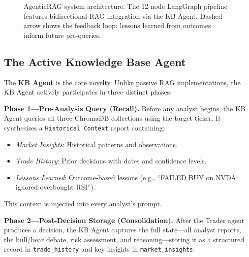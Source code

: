 \documentclass[conference]{IEEEtran}
\begin{document}
\begin{figure}[htbp]
\caption{AgenticRAG system architecture. The 12-node LangGraph pipeline features bidirectional RAG integration via the KB Agent. Dashed arrow shows the feedback loop: lessons learned from outcomes inform future pre-queries.}
\label{fig:architecture}
\end{figure}

\subsection{The Active Knowledge Base Agent}

The \textbf{KB Agent} is the core novelty. Unlike passive RAG implementations, the KB Agent actively participates in three distinct phases:

\textbf{Phase 1---Pre-Analysis Query (Recall).} Before any analyst begins, the KB Agent queries all three ChromaDB collections using the target ticker. It synthesizes a \texttt{Historical Context} report containing:
\begin{itemize}
\item \textit{Market Insights}: Historical patterns and observations.
\item \textit{Trade History}: Prior decisions with dates and confidence levels.
\item \textit{Lessons Learned}: Outcome-based lessons (e.g., ``FAILED BUY on NVDA: ignored overbought RSI'').
\end{itemize}
This context is injected into every analyst's prompt.

\textbf{Phase 2---Post-Decision Storage (Consolidation).} After the Trader agent produces a decision, the KB Agent captures the full state---all analyst reports, the bull/bear debate, risk assessment, and reasoning---storing it as a structured record in \texttt{trade\_history} and key insights in \texttt{market\_insights}.
\end{document}
